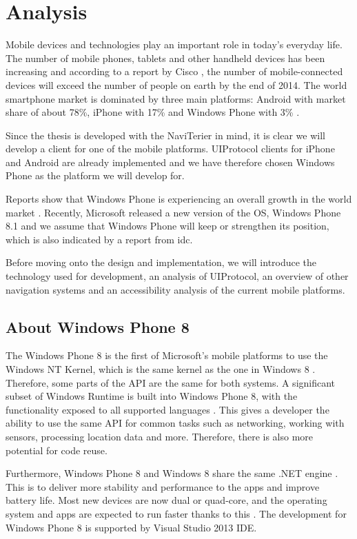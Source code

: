 \chapter{Analysis}
Mobile devices and technologies play an important role in today's everyday life. The number of mobile phones, tablets and other handheld devices has been increasing and according to a report by Cisco \cite{cisco}, the number of mobile-connected devices will exceed the number of people on earth by the end of 2014. The world smartphone market is dominated by three main platforms: Android with market share of about 78\%, iPhone with 17\% and Windows Phone with 3\% \cite{phoneMkt}.

Since the thesis is developed with the NaviTerier in mind, it is clear we will develop a client for one of the mobile platforms. UIProtocol clients for iPhone and Android are already implemented and we have therefore chosen Windows Phone as the platform we will develop for.

Reports show that Windows Phone is experiencing an overall growth in the world market \cite{phoneMkt}. Recently, Microsoft released a new version of the OS, Windows Phone 8.1 and we assume that Windows Phone will keep or strengthen its position, which is also indicated by a report \cite{idcrep} from idc.

Before moving onto the design and implementation, we will introduce the technology used for development, an analysis of UIProtocol, an overview of other navigation systems and an accessibility analysis of the current mobile platforms.

\section{About Windows Phone 8}
The Windows Phone 8 is the first of Microsoft's mobile platforms to use the Windows NT Kernel, which is the same kernel as the one in Windows 8 \cite{wp8kernel}. Therefore, some parts of the API are the same for both systems. A significant subset of Windows Runtime is built into Windows Phone 8, with the functionality exposed to all supported languages \cite{wp8comparison}. This gives a developer the ability to use the same API for common tasks such as networking, working with sensors, processing location data and more. Therefore, there is also more potential for code reuse.

Furthermore, Windows Phone 8 and Windows 8 share the same .NET engine \cite{wp8comparison}. This is to deliver more stability and performance to the apps and improve battery life. Most new devices are now dual or quad-core, and the operating system and apps are expected to run faster thanks to this \cite{wp8comparison}. The development for Windows Phone 8 is supported by Visual Studio 2013 IDE.

